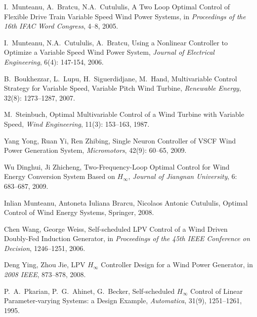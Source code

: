\documentclass[english]{cccconf}
\begin{document}
\begin{thebibliography}{0}
I.~Munteanu, A.~Bratcu, N.A.~Cutululis, A Two Loop Optimal Control of Flexible
Drive Train Variable Speed Wind Power Systems, in \emph{Proceedings of the 16th
IFAC Word Congress}, 4--8, 2005.

I.~Munteanu, N.A.~Cutululis, A.~Bratcu, Using a Nonlinear Controller to Optimize
a Variable Speed Wind Power System, \emph{Journal of Electrical Engineering},
 6(4): 147-154, 2006.

B.~Boukhezzar, L.~Lupu, H.~Siguerdidjane, M.~Hand, Multivariable Control Strategy
for Variable Speed, Variable Pitch Wind Turbine, \emph{Renewable Energy}, 32(8):
1273--1287, 2007.

M.~Steinbuch, Optimal Multivariable Control of a Wind Turbine with Variable Speed,
\emph{Wind Engineering}, 11(3): 153--163, 1987.

Yang Yong, Ruan Yi, Ren Zhibing, Single Neuron Controller of VSCF Wind Power
Generation System, \emph{Micromotors}, 42(9): 60--65, 2009.

Wu Dinghui, Ji Zhicheng, Two-Frequency-Loop Optimal Control for Wind Energy
Conversion System Based on $ H_\infty $, \emph{Journal of Jiangnan University},
6: 683--687, 2009.

Inlian Munteanu, Antoneta Iuliana Brarcu, Nicolaos Antonic Cutululis, Optimal
Control of Wind Energy Systems, Springer, 2008.

Chen Wang, George Weiss, Self-scheduled LPV Control of a Wind Driven
Doubly-Fed Induction Generator, in \emph{Proceedings of the 45th IEEE Conference on
Decision}, 1246--1251, 2006.

Deng Ying, Zhou Jie, LPV $ H_\infty $ Controller Design for a Wind Power Generator,
in \emph{2008 IEEE}, 873--878, 2008.

P.~A.~Pkarian, P.~G.~Ahinet, G.~Becker, Self-scheduled $ H_\infty $ Control of
Linear Parameter-varying Systems: a Design Example, \emph{Automatica}, 31(9),
1251--1261, 1995.

\end{thebibliography}
\end{document}
